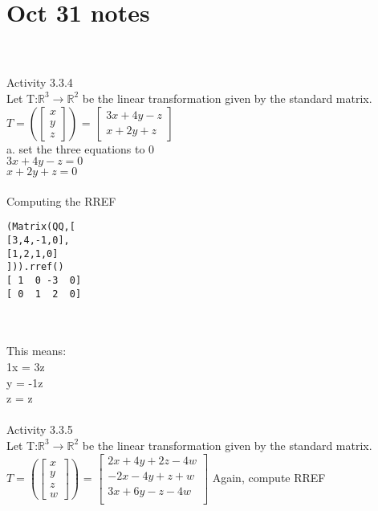 \documentclass{article}
\begin{document}
\section*{Oct 31 notes}\\
\\
Activity 3.3.4\\
Let T:$\mathbb{R}^{3} \rightarrow  \mathbb{R}^{2}$ be the linear transformation given by the standard matrix.\\
$T = 
\left(\left[\begin{matrix} 
x\\y\\z 
\end{matrix}\right]\right)$ = 
$\left[\begin{matrix} 
3x + 4y -z \\ x + 2y + z \end{matrix}\right]$
\\
a. set the three equations to 0\\
$3x+4y-z = 0$\\
$x+2y+z = 0$\\
\\
Computing the RREF\\
\begin{verbatim}
(Matrix(QQ,[
[3,4,-1,0],
[1,2,1,0]
])).rref()
[ 1  0 -3  0]
[ 0  1  2  0]
\end{verbatim}\\
\\
This means: \\
1x = 3z\\
y = -1z \\
z = z\\
\\
Activity 3.3.5\\
Let T:$\mathbb{R}^{3} \rightarrow  \mathbb{R}^{2}$ be the linear transformation given by the standard matrix.\\
$T = 
\left(\left[\begin{matrix} 
x\\y\\z\\w 
\end{matrix}\right]\right)$ = 
$\left[\begin{matrix} 
2x + 4y + 2z - 4w \\ 
-2x - 4y + z + w \\
3x + 6y -z - 4w \\
\end{matrix}\right]$
Again, compute RREF\\
\end{document}
